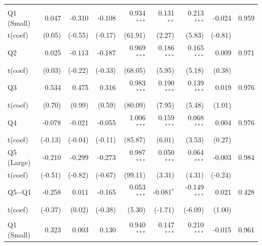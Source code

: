 {\begin{longtable}[t]{lrrrrrrrr}
\endfoot
\bottomrule
\endlastfoot
\addlinespace[0.3em]
\multicolumn{9}{l}{Active --- EW}\\
\hspace{1em}Q1 (Small) & 0.047 & -0.310 & -0.108 & 0.934$^{***}$ & 0.131$^{**}$ & 0.213$^{***}$ & -0.024 & 0.959\\
\hspace{1em}t(coef) & (0.05) & (-0.55) & (-0.17) & (61.91) & (2.27) & (5.83) & (-0.81) & \\
\hspace{1em}Q2 & 0.025 & -0.113 & -0.187 & 0.969$^{***}$ & 0.186$^{***}$ & 0.165$^{***}$ & 0.009 & 0.971\\
\hspace{1em}t(coef) & (0.03) & (-0.22) & (-0.33) & (68.05) & (5.95) & (5.18) & (0.38) & \\
\hspace{1em}Q3 & 0.534 & 0.475 & 0.316 & 0.983$^{***}$ & 0.190$^{***}$ & 0.139$^{***}$ & 0.019 & 0.976\\
\hspace{1em}t(coef) & (0.70) & (0.99) & (0.59) & (80.09) & (7.95) & (5.48) & (1.01) & \\
\hspace{1em}Q4 & -0.078 & -0.021 & -0.055 & 1.006$^{***}$ & 0.159$^{***}$ & 0.068$^{***}$ & 0.004 & 0.976\\
\hspace{1em}t(coef) & (-0.13) & (-0.04) & (-0.11) & (85.87) & (6.01) & (3.53) & (0.27) & \\
\hspace{1em}Q5 (Large) & -0.210 & -0.299 & -0.273 & 0.987$^{***}$ & 0.050$^{***}$ & 0.064$^{***}$ & -0.003 & 0.984\\
\hspace{1em}t(coef) & (-0.51) & (-0.82) & (-0.67) & (99.11) & (3.31) & (4.31) & (-0.24) & \\
\hspace{1em}Q5$-$Q1 & -0.258 & 0.011 & -0.165 & 0.053$^{***}$ & -0.081$^{*}$ & -0.149$^{***}$ & 0.021 & 0.428\\
\hspace{1em}t(coef) & (-0.37) & (0.02) & (-0.38) & (5.30) & (-1.71) & (-6.09) & (1.00) & \\
\addlinespace[0.3em]
\hline
\multicolumn{9}{l}{Active --- VW}\\
\hspace{1em}Q1 (Small) & 0.323 & 0.003 & 0.130 & 0.940$^{***}$ & 0.147$^{***}$ & 0.210$^{***}$ & -0.015 & 0.961\\

\end{longtable}}
